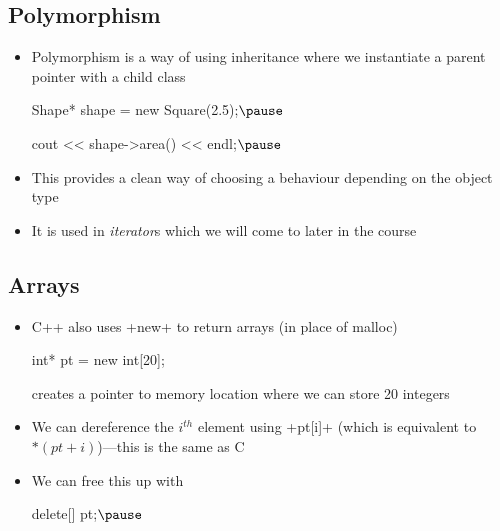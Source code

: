 
\begin{slide}
\section{Polymorphism}
  
\begin{PauseHighLight}
  \begin{itemize}
  \item Polymorphism is a way of using inheritance where we
    instantiate a parent pointer with a child class
    \begin{cpp}
      Shape* shape = new Square(2.5);$\pause$

      cout << shape->area() << endl;$\pause$
    \end{cpp}
  \item This provides a clean way of choosing a behaviour depending on
    the object type\pause
  \item It is used in \textit{iterator}s which we will come to later
    in the course\pause
  \end{itemize}
\end{PauseHighLight}

\end{slide}


\begin{slide}
\section{Arrays}

\begin{PauseHighLight}
  \begin{itemize}
  \item C++ also uses \jl+new+ to return arrays (in place of malloc)
    \begin{cpp}
      int* pt = new int[20];
    \end{cpp}
    creates a pointer to memory location where we can store 20
    integers\pause
  \item We can dereference the $i^{th}$ element using \jl+pt[i]+\pause
    (which is equivalent to \jl$*(pt+i)$)\pauseb---this is the same as C\pauseb
  \item We can free this up with
    \begin{cpp}
      delete[] pt;$\pause$
    \end{cpp}
  \end{itemize}
\end{PauseHighLight}

\end{slide}



